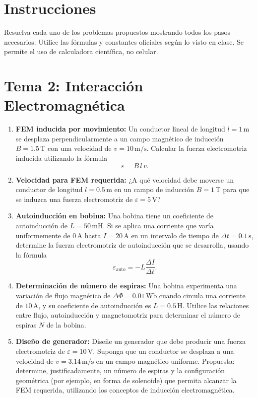 \documentclass[a4paper,12pt]{article}
\begin{document}
\section*{Instrucciones}
Resuelva cada uno de los problemas propuestos mostrando todos los pasos necesarios. Utilice las fórmulas y constantes oficiales según lo visto en clase. Se permite el uso de calculadora científica, no celular.
\section*{Tema 2: Interacción Electromagnética}

\begin{enumerate}[label=\textbf{2.\arabic*}]
    \item \textbf{FEM inducida por movimiento:}  
    Un conductor lineal de longitud $l=1\,\mathrm{m}$ se desplaza perpendicularmente a un campo magnético de inducción $B=1.5\,\mathrm{T}$ con una velocidad de $v=10\,\mathrm{m/s}$. Calcular la fuerza electromotriz inducida utilizando la fórmula 
    \[
    \varepsilon = B \, l \, v.
    \]

    \item \textbf{Velocidad para FEM requerida:}  
    ¿A qué velocidad debe moverse un conductor de longitud $l=0.5\,\mathrm{m}$ en un campo de inducción $B=1\,\mathrm{T}$ para que se induzca una fuerza electromotriz de $\varepsilon = 5\,\mathrm{V}$?

    \item \textbf{Autoinducción en bobina:}  
    Una bobina tiene un coeficiente de autoinducción de $L=50\,\mathrm{mH}$. Si se aplica una corriente que varía uniformemente de $0\,\mathrm{A}$ hasta $I=20\,\mathrm{A}$ en un intervalo de tiempo de $\Delta t=0.1\,\mathrm{s}$, determine la fuerza electromotriz de autoinducción que se desarrolla, usando la fórmula 
    \[
    \varepsilon_{\text{auto}} = -L \frac{\Delta I}{\Delta t}.
    \]

    \item \textbf{Determinación de número de espiras:}  
    Una bobina experimenta una variación de flujo magnético de $\Delta \Phi = 0.01\,\mathrm{Wb}$ cuando circula una corriente de $10\,\mathrm{A}$, y su coeficiente de autoinducción es $L=0.5\,\mathrm{H}$. Utilice las relaciones entre flujo, autoinducción y magnetomotriz para determinar el número de espiras $N$ de la bobina.

    \item \textbf{Diseño de generador:}  
    Diseñe un generador que debe producir una fuerza electromotriz de $\varepsilon = 10\,\mathrm{V}$. Suponga que un conductor se desplaza a una velocidad de $v=3.14\,\mathrm{m/s}$ en un campo magnético uniforme. Propuesta: determine, justificadamente, un número de espiras y la configuración geométrica (por ejemplo, en forma de solenoide) que permita alcanzar la FEM requerida, utilizando los conceptos de inducción electromagnética.
\end{enumerate}
\end{document}

